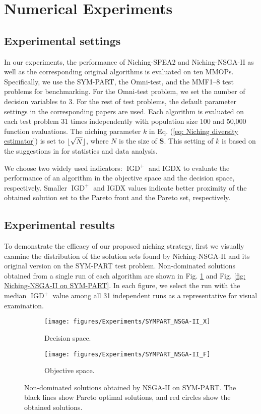 \section{Numerical Experiments}
\label{sec: Experiments}
\subsection{Experimental settings}
In our experiments, the performance of Niching-SPEA2 and Niching-NSGA-II as well as the corresponding original algorithms is evaluated on ten MMOPs. Specifically, we use the SYM-PART\cite{SYMPART}, the Omni-test\cite{OmniOptimizer}, and the MMF1--8\cite{MO_Ring_PSO_SCD} test problems for benchmarking. For the Omni-test problem, we set the number of decision variables to $3$. For the rest of test problems, the default parameter settings in the corresponding papers \cite{SYMPART, MO_Ring_PSO_SCD} are used. Each algorithm is evaluated on each test problem 31 times independently with population size 100 and 50,000 function evaluations. The niching parameter $k$ in Eq. (\ref{eq: Niching diversity estimator}) is set to $\lfloor\sqrt{N}\rfloor$, where $N$ is the size of $\boldsymbol{S}$. This setting of $k$ is based on the suggestions in \cite{silverman1986density} for statistics and data analysis.

We choose two widely used indicators: $\operatorname{IGD}^+$\cite{IGDPlus} and IGDX\cite{IGDX} to evaluate the performance of an algorithm in the objective space and the decision space, respectively. Smaller $\operatorname{IGD}^+$ and IGDX values indicate better proximity of the obtained solution set to the Pareto front and the Pareto set, respectively.

\subsection{Experimental results}
To demonstrate the efficacy of our proposed niching strategy, first we visually examine the distribution of the solution sets found by Niching-NSGA-II and its original version on the SYM-PART test problem. Non-dominated solutions obtained from a single run of each algorithm are shown in Fig. \ref{fig: NSGA-II on SYM-PART} and Fig. \ref{fig: Niching-NSGA-II on SYM-PART}. In each figure, we select the run with the median $\operatorname{IGD}^+$ value among all 31 independent runs as a representative for visual examination.

\begin{figure}
	\centering
	\begin{subfigure}[b]{.49\textwidth}
		\texttt{[image: figures/Experiments/SYMPART\_NSGA-II\_X]}
		\caption{Decision space.}
	\end{subfigure}
	\begin{subfigure}[b]{.49\textwidth}
		\texttt{[image: figures/Experiments/SYMPART\_NSGA-II\_F]}
		\caption{Objective space.}
	\end{subfigure}
	\caption{Non-dominated solutions obtained by NSGA-II on SYM-PART. The black lines show Pareto optimal solutions, and red circles show the obtained solutions.}
	\label{fig: NSGA-II on SYM-PART}
\end{figure}

